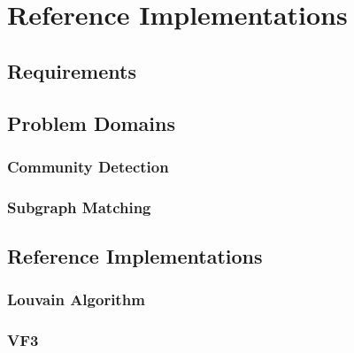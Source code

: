 \section{Reference Implementations}\label{section:Implementations}

\subsection{Requirements}

\subsection{Problem Domains}

\subsubsection{Community Detection}

\subsubsection{Subgraph Matching}

\subsection{Reference Implementations}

\subsubsection{Louvain Algorithm}

\subsubsection{VF3}